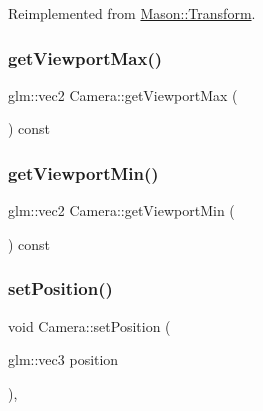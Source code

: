 Reimplemented from \hyperlink{class_mason_1_1_transform_a24107560725b250c4c2e10ab98a6ac04}{Mason\+::\+Transform}.

\hypertarget{class_mason_1_1_camera_abe43550148e85f5a32919a3c8b8ff115}{}\label{class_mason_1_1_camera_abe43550148e85f5a32919a3c8b8ff115} 
\subsubsection{\texorpdfstring{get\+Viewport\+Max()}{getViewportMax()}}
{\footnotesize\ttfamily glm\+::vec2 Camera\+::get\+Viewport\+Max (\begin{DoxyParamCaption}{ }\end{DoxyParamCaption}) const}

\hypertarget{class_mason_1_1_camera_a0d2d26d8b7b80ab508ed4f4f537614b5}{}\label{class_mason_1_1_camera_a0d2d26d8b7b80ab508ed4f4f537614b5} 
\subsubsection{\texorpdfstring{get\+Viewport\+Min()}{getViewportMin()}}
{\footnotesize\ttfamily glm\+::vec2 Camera\+::get\+Viewport\+Min (\begin{DoxyParamCaption}{ }\end{DoxyParamCaption}) const}

\hypertarget{class_mason_1_1_camera_a69f184af46d081b85209040bbe814cbb}{}\label{class_mason_1_1_camera_a69f184af46d081b85209040bbe814cbb} 
\subsubsection{\texorpdfstring{set\+Position()}{setPosition()}}
{\footnotesize\ttfamily void Camera\+::set\+Position (\begin{DoxyParamCaption}\item[{glm\+::vec3}]{position }\end{DoxyParamCaption})\hspace{0.3cm}{\ttfamily [override]}, {\ttfamily [virtual]}}



